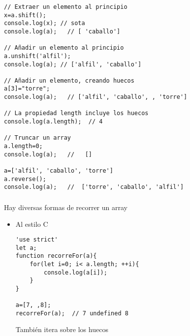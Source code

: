 \documentclass[ucs]{beamer}
\begin{document}
\begin{frame}[fragile]
\frametitle{}

  \begin{scriptsize}
  \begin{verbatim}
// Extraer un elemento al principio
x=a.shift();
console.log(x); // sota
console.log(a);   // [ 'caballo']

// Añadir un elemento al principio
a.unshift('alfil');
console.log(a); // ['alfil', 'caballo']

// Añadir un elemento, creando huecos
a[3]="torre";
console.log(a);   // ['alfil', 'caballo', , 'torre']

// La propiedad length incluye los huecos
console.log(a.length);  // 4

// Truncar un array
a.length=0;
console.log(a);   //   []

a=['alfil', 'caballo', 'torre']
a.reverse();
console.log(a);   //  ['torre', 'caballo', 'alfil']
  \end{verbatim}
  \end{scriptsize}

\end{frame}


\begin{frame}[fragile]
\frametitle{}
Hay diversas formas de recorrer un array
\begin{itemize}
\item
Al estilo C
  \begin{scriptsize}
  \begin{verbatim}
'use strict'
let a;
function recorreFor(a){
    for(let i=0; i< a.length; ++i){
        console.log(a[i]);
    }
}

a=[7, ,8];
recorreFor(a);  // 7 undefined 8
  \end{verbatim}
  \end{scriptsize}


También itera sobre los huecos

\end{itemize}

\end{frame}
\end{document}

